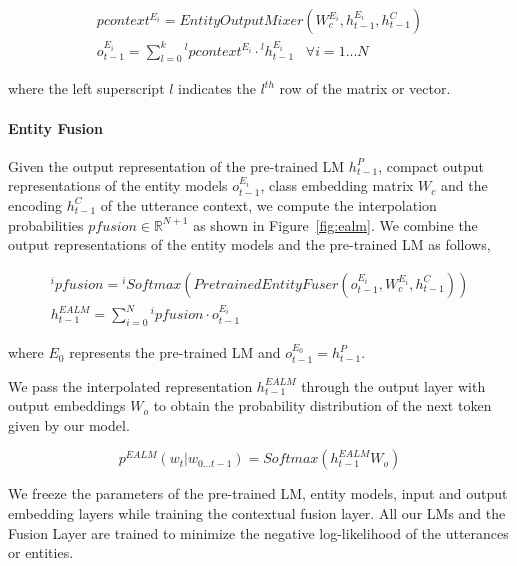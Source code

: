 \documentclass{article}
\begin{document}
\begin{equation}
	\label{eq:entity-outputs}
	\begin{gathered}
	pcontext^{E_i} = EntityOutputMixer(W_c^{E_i}, h_{t-1}^{E_i}, h_{t-1}^C) \\
	o_{t-1}^{E_i} = \sum_{l=0}^{k} {^l}pcontext^{E_i} \cdot {^l}h_{t-1}^{E_i} \;\;\; \forall i = 1...N
	\end{gathered}
\end{equation}

where the left superscript $l$ indicates the $l^{th}$ row of the matrix or vector.


\paragraph{Entity Fusion} Given the output representation of the pre-trained LM $h_{t-1}^P$, compact output representations of the entity models  $o_{t-1}^{E_i}$, class embedding matrix $W_c$ and the encoding $h_{t-1}^C$ of the utterance context, we compute the interpolation probabilities $pfusion \in \mathbb{R}^{N+1}$ as shown in Figure~\ref{fig:ealm}. We combine the output representations of the entity models and the pre-trained LM as follows,

\begin{equation}
	\label{eq:entity-fusion}
	\begin{gathered}
	{^i}pfusion = {^i}Softmax(PretrainedEntityFuser(o_{t-1}^{E_i}, W_c^{E_i}, h_{t-1}^C)) \\
	h_{t-1}^{EALM} = \sum_{i=0}^{N} {^i}pfusion \cdot o_{t-1}^{E_i}
	\end{gathered}
\end{equation}

where  $E_0$ represents the pre-trained LM and $o_{t-1}^{E_0} = h_{t-1}^P$.

We pass the interpolated representation $h_{t-1}^{EALM}$ through the output layer with output embeddings $W_o$ to obtain the probability distribution of the next token given by our model.

\begin{equation}
	\label{eq:ealm-probability}
	p^{EALM}(w_t|w_{0...t-1} ) = Softmax(h_{t-1}^{EALM}W_o)
\end{equation}

We freeze the parameters of the pre-trained LM, entity models, input and output embedding layers while training the contextual fusion layer. All our LMs and the Fusion Layer are trained to minimize the negative log-likelihood of the utterances or entities.
\end{document}
